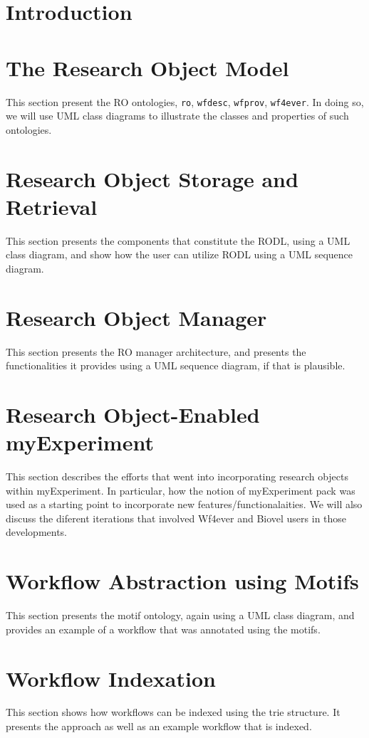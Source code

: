 \documentclass[a4paper, twoside, 11pt]{article}
\begin{document}
\section{Introduction}

\section{The Research Object Model}
This section present the RO ontologies,  \texttt{ro}, \texttt{wfdesc}, \texttt{wfprov}, \texttt{wf4ever}. In doing so, we will use UML class diagrams to illustrate the classes and properties of such ontologies.

\section{Research Object Storage and Retrieval}
This section presents the components that constitute the RODL, using a UML class diagram, and show how the user can utilize RODL using a UML sequence diagram.

\section{Research Object Manager}
This section presents the RO manager architecture, and presents the functionalities it provides using  a UML sequence diagram, if that is plausible. 

\section{Research Object-Enabled myExperiment}
This section describes the efforts that went into incorporating research objects within myExperiment. In particular, how the notion of myExperiment pack was used as a starting point to incorporate new features/functionalaities. We will also discuss the diferent iterations that involved Wf4ever and Biovel users in those developments.

\section{Workflow Abstraction using Motifs}
This section presents the motif ontology, again using a UML class diagram, and provides an example of a workflow that was annotated using the motifs.

\section{Workflow Indexation}
This section shows how workflows can be indexed using the trie structure. It presents the approach as well as an example workflow that is indexed.


\appendix
\clearpage
{}


\label{lastpage}
\end{document}
